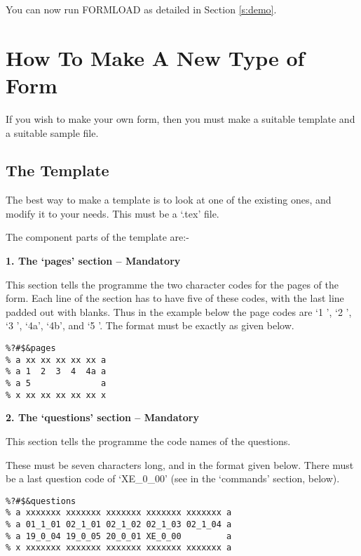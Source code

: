 You can now run FORMLOAD as detailed in Section \ref{s:demo}.

\section{How To Make A New Type of Form}
\label{se:make}

If you wish to make your own form, then you must make a suitable template
and a suitable sample file.

\subsection{The Template}

The best way to make a template is to look at one of the existing ones, and
modify it to your needs. This must be a `.tex' file.

The component parts of the template are:-


\vspace*{0.2cm}
{\bf \large 1. The `pages' section -- Mandatory}
\vspace*{0.2cm}

This section tells the programme the two character codes for the pages of
the form. Each line of the section has to have five of these codes, with
the last line padded out with blanks. Thus in the example below the page
codes are `1 ', `2 ', `3 ', `4a', `4b', and `5 '. The format must be
exactly as given below.

\begin{verbatim}
%?#$&pages
% a xx xx xx xx xx a
% a 1  2  3  4  4a a
% a 5              a
% x xx xx xx xx xx x
\end{verbatim}

\vspace*{0.2cm}
{\bf \large 2. The `questions' section -- Mandatory}
\vspace*{0.2cm}

This section tells the programme the code names of the questions.

These must be seven characters long, and in the format given below. There
must be a last question code of `XE\_0\_00' (see in the `commands' section,
below).

\begin{verbatim}
%?#$&questions
% a xxxxxxx xxxxxxx xxxxxxx xxxxxxx xxxxxxx a
% a 01_1_01 02_1_01 02_1_02 02_1_03 02_1_04 a
% a 19_0_04 19_0_05 20_0_01 XE_0_00         a
% x xxxxxxx xxxxxxx xxxxxxx xxxxxxx xxxxxxx a
\end{verbatim}

